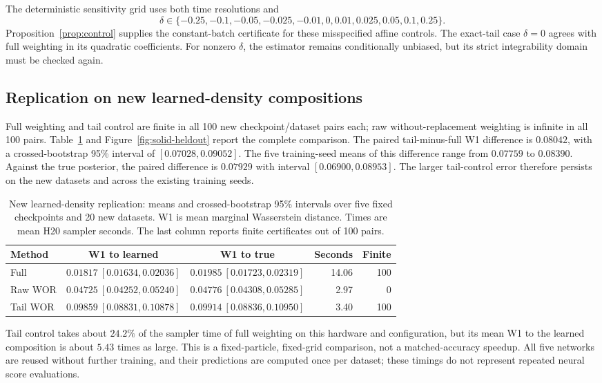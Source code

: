 The deterministic sensitivity grid uses both time resolutions and
\[
 \delta\in\{-0.25,-0.1,-0.05,-0.025,-0.01,0,0.01,0.025,0.05,0.1,0.25\}.
\]
Proposition~\ref{prop:control} supplies the constant-batch certificate for these misspecified affine controls. The exact-tail case $\delta=0$ agrees with full weighting in its quadratic coefficients. For nonzero $\delta$, the estimator remains conditionally unbiased, but its strict integrability domain must be checked again.

\subsection{Replication on new learned-density compositions}
Full weighting and tail control are finite in all 100 new checkpoint/dataset pairs each; raw without-replacement weighting is infinite in all 100 pairs. Table~\ref{tab:solid-heldout} and Figure~\ref{fig:solid-heldout} report the complete comparison. The paired tail-minus-full W1 difference is $0.08042$, with a crossed-bootstrap 95\% interval of $[0.07028,0.09052]$. The five training-seed means of this difference range from $0.07759$ to $0.08390$. Against the true posterior, the paired difference is $0.07929$ with interval $[0.06900,0.08953]$. The larger tail-control error therefore persists on the new datasets and across the existing training seeds.

\begin{table}[H]
 \centering
 \caption{New learned-density replication: means and crossed-bootstrap 95\% intervals over five fixed checkpoints and 20 new datasets. W1 is mean marginal Wasserstein distance. Times are mean H20 sampler seconds. The last column reports finite certificates out of 100 pairs.}
 \label{tab:solid-heldout}
 \small
 \begin{tabular}{lccrr}
 \toprule
 Method & W1 to learned & W1 to true & Seconds & Finite\\
 \midrule
 Full & $0.01817\ [0.01634,0.02036]$ & $0.01985\ [0.01723,0.02319]$ & 14.06 & 100\\
 Raw WOR & $0.04725\ [0.04252,0.05240]$ & $0.04776\ [0.04308,0.05285]$ & 2.97 & 0\\
 Tail WOR & $0.09859\ [0.08831,0.10878]$ & $0.09914\ [0.08836,0.10950]$ & 3.40 & 100\\
 \bottomrule
 \end{tabular}
\end{table}

Tail control takes about $24.2\%$ of the sampler time of full weighting on this hardware and configuration, but its mean W1 to the learned composition is about $5.43$ times as large. This is a fixed-particle, fixed-grid comparison, not a matched-accuracy speedup. All five networks are reused without further training, and their predictions are computed once per dataset; these timings do not represent repeated neural score evaluations.

